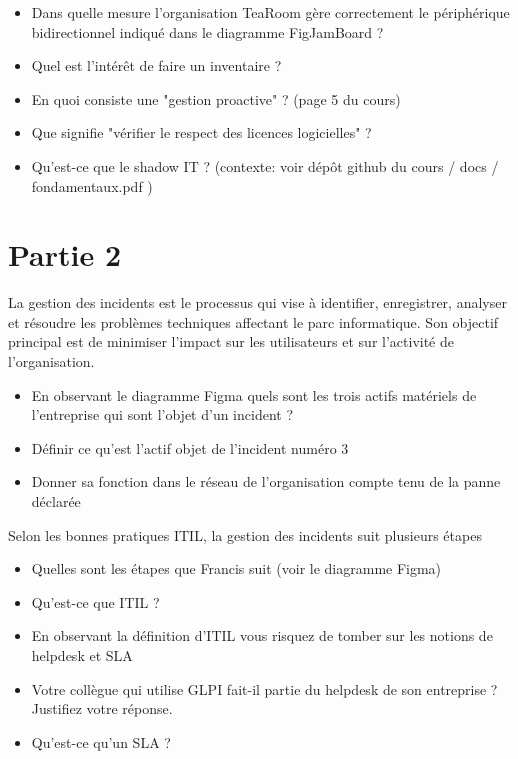 \documentclass[12pt, letterpaper]{article}
\begin{document}
\begin{itemize}
    \item Dans quelle mesure l'organisation TeaRoom gère correctement le périphérique bidirectionnel indiqué dans le diagramme FigJamBoard ?
\end{itemize}


\begin{itemize}
    \item Quel est l'intérêt de faire un inventaire ?
    \item En quoi consiste une "gestion proactive" ? (page 5 du cours)
    \item Que signifie "vérifier le respect des licences logicielles" ?
    \item Qu'est-ce que le shadow IT ? (contexte: voir dépôt github du cours / docs / fondamentaux.pdf )
\end{itemize}


\section*{Partie 2}

\begin{tcolorbox}[colback=cyan!5,colframe=cyan!60!black,title=Définition]
La gestion des incidents est le processus qui vise à identifier, enregistrer, analyser et résoudre les problèmes techniques affectant le parc informatique. Son objectif principal est de minimiser l’impact sur les utilisateurs et sur l’activité de l’organisation.
\end{tcolorbox}

\begin{itemize}
    \item En observant le diagramme Figma quels sont les trois actifs matériels de l'entreprise qui sont l'objet d'un incident ?
    \item Définir ce qu'est l'actif objet de l'incident numéro 3
    \item Donner sa fonction dans le réseau de l'organisation compte tenu de la panne déclarée
\end{itemize}

\begin{tcolorbox}[colback=cyan!5,colframe=cyan!60!black,title=ITIL]
Selon les bonnes pratiques ITIL, la gestion des incidents suit plusieurs étapes 
\end{tcolorbox}

\begin{itemize}
    \item Quelles sont les étapes que Francis suit (voir le diagramme Figma)
    \item Qu'est-ce que ITIL ?
    \item En observant la définition d'ITIL vous risquez de tomber sur les notions de helpdesk et SLA
    \item Votre collègue qui utilise GLPI fait-il partie du helpdesk de son entreprise ? Justifiez votre réponse.
    \item Qu'est-ce qu'un SLA ?
\end{itemize}
\end{document}
